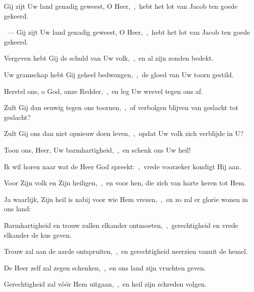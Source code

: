 \documentclass[12pt,twoside,a5paper]{article}
\begin{document}
\begin{halfparskip}
   Gij zijt Uw land genadig geweest, O Heer,~\sep\ hebt het lot van Jacob ten goede gekeerd.

  ~--- Gij zijt Uw land genadig geweest, O Heer,~\sep\ hebt het lot van Jacob ten goede gekeerd.

  Vergeven hebt Gij de schuld van Uw volk,~\sep\ en al zijn zonden bedekt.

  Uw gramschap hebt Gij geheel bedwongen,~\sep\ de gloed van Uw toorn gestild.

  Herstel ons, o God, onze Redder,~\sep\ en leg Uw wrevel tegen ons af.

  Zult Gij dan eeuwig tegen ons toornen,~\sep\ of verbolgen blijven van geslacht tot geslacht?

  Zult Gij ons dan niet opnieuw doen leven,~\sep\ opdat Uw volk zich verblijde in U?

  Toon ons, Heer, Uw barmhartigheid,~\sep\ en schenk ons Uw heil!

  Ik wil horen naar wat de Heer God spreekt:~\sep\ vrede voorzeker kondigt Hij aan.

  Voor Zijn volk en Zijn heiligen,~\sep\ en voor hen, die zich van harte keren tot Hem.

  Ja waarlijk, Zijn heil is nabij voor wie Hem vrezen,~\sep\ en zo zal er glorie wonen in ons land:

  Barmhartigheid en trouw zullen elkander ontmoeten,~\sep\ gerechtigheid en vrede elkander de kus geven.

  Trouw zal aan de aarde ontspruiten,~\sep\ en gerechtigheid neerzien vanuit de hemel.

  De Heer zelf zal zegen schenken,~\sep\ en ons land zijn vruchten geven.

  Gerechtigheid zal vóór Hem uitgaan,~\sep\ en heil zijn schreden volgen.
\end{halfparskip}
\end{document}
